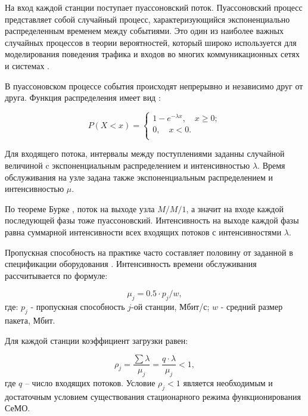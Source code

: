 На вход каждой станции поступает пуассоновский поток. Пуассоновский процесс представляет собой случайный процесс, характеризующийся  экспоненциально распределенным временем между событиями. Это один из наиболее важных случайных процессов в теории вероятностей, который широко используется для моделирования поведения трафика и входов во многих коммуникационных сетях и системах \cite{Kalor2018, Gao2016, Malandra2018, Seliem2019}. 

В пуассоновском процессе события происходят непрерывно и независимо друг от друга. Функция распределения имеет вид  \cite{VishnevskyBook, Kleinrock1975}:

\begin{displaymath}
P(X<x) = 
  \begin{cases}
    1 - e^{- \lambda x}, \quad x \geqslant 0; \\
    0, \quad x < 0.\\
  \end{cases}
\end{displaymath}

Для входящего потока, интервалы между поступлениями заданны случайной величиной c экспоненциальным распределением и интенсивностью $\lambda$. Время обслуживания на узле задана также экспоненциальным распределением и интенсивностью $\mu$. 


По теореме Бурке \cite{Burke1956}, поток на выходе узла $M/M/1$, а значит на входе каждой последующей фазы тоже пуассоновский. Интенсивность на выходе каждой фазы равна суммарной интенсивности всех входящих потоков с интенсивностями $\lambda$.

Пропускная способность на практике часто составляет половину от заданной в спецификации оборудования \cite{Proletarsky, Vladimirov2019}. Интенсивность времени обслуживания рассчитывается по формуле: 

\begin{displaymath}
    \mu_j = 0.5 \cdot p_j / w,
\end{displaymath}
где: $p_j$ - пропускная способность $j$-ой станции, Мбит/с; $w$ - средний размер пакета, Мбит.

Для каждой станции коэффициент загрузки равен:


\begin{displaymath}
\rho_j= \frac{\sum{\lambda}}{\mu_j} = \frac{q \cdot \lambda}{\mu_j} <1,
\end{displaymath}
где $q$ -- число входящих потоков. Условие $\rho_j<1$ является необходимым и достаточным условием существования стационарного режима функционирования СеМО.

